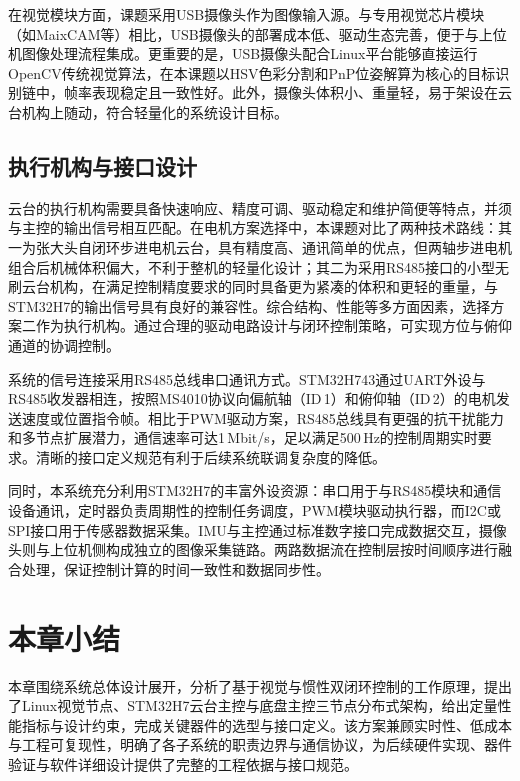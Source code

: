 在视觉模块方面，课题采用USB摄像头作为图像输入源。与专用视觉芯片模块（如MaixCAM等）相比，USB摄像头的部署成本低、驱动生态完善，便于与上位机图像处理流程集成。更重要的是，USB摄像头配合Linux平台能够直接运行OpenCV传统视觉算法，在本课题以HSV色彩分割和PnP位姿解算为核心的目标识别链中，帧率表现稳定且一致性好。此外，摄像头体积小、重量轻，易于架设在云台机构上随动，符合轻量化的系统设计目标。

\subsection{执行机构与接口设计}

云台的执行机构需要具备快速响应、精度可调、驱动稳定和维护简便等特点，并须与主控的输出信号相互匹配。在电机方案选择中，本课题对比了两种技术路线：其一为张大头自闭环步进电机云台，具有精度高、通讯简单的优点，但两轴步进电机组合后机械体积偏大，不利于整机的轻量化设计；其二为采用RS485接口的小型无刷云台机构，在满足控制精度要求的同时具备更为紧凑的体积和更轻的重量，与STM32H7的输出信号具有良好的兼容性。综合结构、性能等多方面因素，选择方案二作为执行机构。通过合理的驱动电路设计与闭环控制策略，可实现方位与俯仰通道的协调控制。

系统的信号连接采用RS485总线串口通讯方式。STM32H743通过UART外设与RS485收发器相连，按照MS4010协议向偏航轴（ID\,1）和俯仰轴（ID\,2）的电机发送速度或位置指令帧。相比于PWM驱动方案，RS485总线具有更强的抗干扰能力和多节点扩展潜力，通信速率可达1\,Mbit/s，足以满足500\,Hz的控制周期实时要求。清晰的接口定义规范有利于后续系统联调复杂度的降低。

同时，本系统充分利用STM32H7的丰富外设资源：串口用于与RS485模块和通信设备通讯，定时器负责周期性的控制任务调度，PWM模块驱动执行器，而I2C或SPI接口用于传感器数据采集。IMU与主控通过标准数字接口完成数据交互，摄像头则与上位机侧构成独立的图像采集链路。两路数据流在控制层按时间顺序进行融合处理，保证控制计算的时间一致性和数据同步性。

\section{本章小结}

本章围绕系统总体设计展开，分析了基于视觉与惯性双闭环控制的工作原理，提出了Linux视觉节点、STM32H7云台主控与底盘主控三节点分布式架构，给出定量性能指标与设计约束，完成关键器件的选型与接口定义。该方案兼顾实时性、低成本与工程可复现性，明确了各子系统的职责边界与通信协议，为后续硬件实现、器件验证与软件详细设计提供了完整的工程依据与接口规范。
